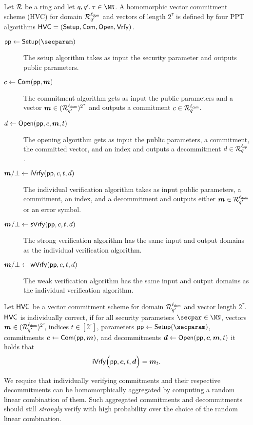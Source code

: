 \begin{definition}\label{def:hvc}
  Let $\mathcal{R}$ be a ring and let $q,q',\tau\in\NN$.
  A homomorphic vector commitment scheme (HVC) for domain $\mathcal{R}^{\ell_{\mathsf{dom}}}_{q'}$ and vectors of length $2^\tau$ is defined by four PPT algorithms $\mathsf{HVC}=(\mathsf{Setup},\mathsf{Com},\allowbreak\mathsf{Open},\mathsf{Vrfy})$.
\begin{description}
    \item[$\params\gets\setup(\secparam)$] The setup algorithm takes as input the security parameter and outputs public parameters.
    \item[$c \gets \mathsf{Com}(\mathsf{pp},\boldsymbol{m})$] The commitment algorithm gets as input the public parameters and a vector $\boldsymbol{m}\in(\mathcal{R}_{q'}^{\ell_{\mathsf{dom}}})^{2^\tau}$ and outputs a commitment $c\in\mathcal{R}_q^{\ell_{\mathsf{com}}}$.
    \item[$d \gets \mathsf{Open}(\mathsf{pp},c,\boldsymbol{m},t)$] The opening algorithm gets as input the public parameters, a commitment, the committed vector, and an index and outputs a decommitment $d\in\mathcal{R}_q^{{\ell_{\mathsf{op}}}}$.
    \item[$\boldsymbol{m}/\bot\gets \mathsf{iVrfy}(\mathsf{pp},c,t,d)$] The individual verification algorithm takes as input public parameters, a commitment, an index, and a decommitment and outputs either $\boldsymbol{m}\in\mathcal{R}^{\ell_{\mathsf{dom}}}_{q'}$ or an error symbol.
    \item[$\boldsymbol{m}/\bot\gets \mathsf{sVrfy}(\mathsf{pp},c,t,d)$] The strong verification algorithm has the same input and output domains as the individual verification algorithm.
    \item[$\boldsymbol{m}/\bot\gets \mathsf{wVrfy}(\mathsf{pp},c,t,d)$] The weak verification algorithm has the same input and output domains as the individual verification algorithm.
  \end{description}
\end{definition}
\begin{definition}
Let $\mathsf{HVC}$ be a vector commitment scheme for domain $\mathcal{R}^{\ell_{\mathsf{dom}}}_{q'}$ and vector length $2^\tau$.
  $\mathsf{HVC}$ is individually correct, if for all security parameters $\secpar\in\NN$, vectors $\boldsymbol{m}\in(\mathcal{R}_{q'}^{\ell_{\mathsf{dom}}})^{2^\tau}\!\!$, indices $t\in[2^\tau]$, parameters $\params \gets \setup(\secparam)$, commitments $\boldsymbol{c} \gets \mathsf{Com}(\mathsf{pp},\boldsymbol{m})$, and decommitments $\boldsymbol{d} \gets \mathsf{Open}(\mathsf{pp},\boldsymbol{c},\boldsymbol{m},t)$ it holds that
  \[
    \mathsf{iVrfy}\Bigl(\mathsf{pp},\boldsymbol{c},t,\boldsymbol{d}\Bigr) = \boldsymbol{m}_{t}.
  \]
\end{definition}
%
We require that individually verifying commitments and their respective decommitments can be homomorphically aggregated by computing a random linear combination of them.
Such aggregated commitments and decommitments should still \emph{strongly} verify with high probability over the choice of the random linear combination.

